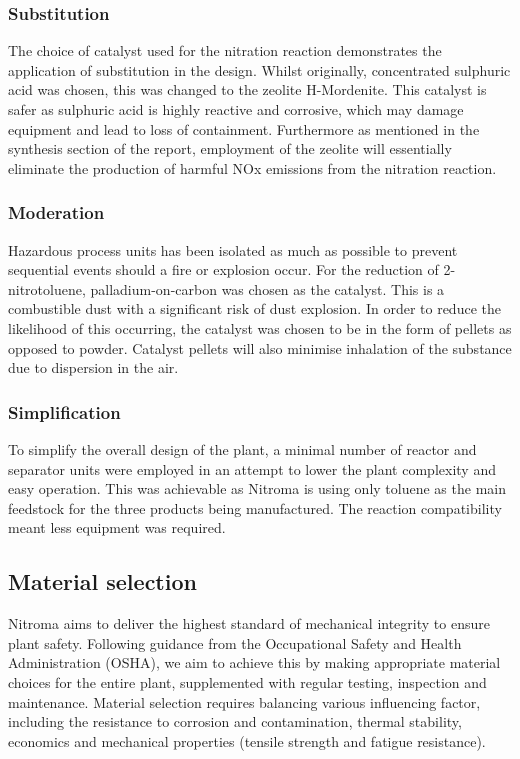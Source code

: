 \subsubsection{Substitution} 
The choice of catalyst used for the nitration reaction demonstrates the application of substitution in the design. Whilst originally, concentrated sulphuric acid was chosen, this was changed to the zeolite H-Mordenite. This catalyst is safer as sulphuric acid is highly reactive and corrosive, which may damage equipment and lead to loss of containment. Furthermore as mentioned in the synthesis section of the report, employment of the zeolite will essentially eliminate the production of harmful NOx emissions from the nitration reaction. 

\subsubsection{Moderation} 
Hazardous process units has been isolated as much as possible to prevent sequential events should a fire or explosion occur. For the reduction of 2-nitrotoluene,  palladium-on-carbon was chosen as the catalyst. This is a combustible dust with a significant risk of dust explosion. In order to reduce the likelihood of this occurring, the catalyst was chosen to be in the form of pellets as opposed to powder. Catalyst pellets will also minimise inhalation of the substance due to dispersion in the air. 

\subsubsection{Simplification} 
To simplify the overall design of the plant, a minimal number of reactor and separator units were employed in an attempt to lower the plant complexity and easy operation. This was achievable as Nitroma is using only toluene as the main feedstock for the three products being manufactured. The reaction compatibility meant less equipment was required. 

\subsection{Material selection}

Nitroma aims to deliver the highest standard of mechanical integrity to ensure plant safety.  Following guidance from the Occupational Safety and Health Administration (OSHA), we aim to achieve this by making appropriate material choices for the entire plant, supplemented with regular testing, inspection and maintenance. 
Material selection requires balancing various influencing factor, including the resistance to corrosion and contamination, thermal stability, economics and mechanical properties (tensile strength and fatigue resistance). 

